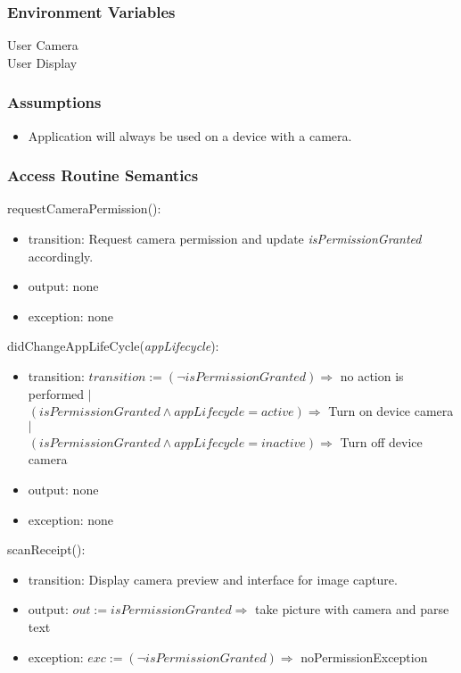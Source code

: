 \documentclass[12pt, titlepage]{article}
\begin{document}
\subsubsection{Environment Variables}

User Camera \\
User Display

\subsubsection{Assumptions}

\begin{itemize}
  \item Application will always be used on a device with a camera.
\end{itemize}

\subsubsection{Access Routine Semantics}

\noindent requestCameraPermission():
\begin{itemize}
  \item transition: Request camera permission and update \textit{isPermissionGranted} accordingly.
  \item output: none
  \item exception: none
  \end{itemize}

\noindent didChangeAppLifeCycle(\textit{appLifecycle}):
\begin{itemize}
  \item transition: $transition := (\neg isPermissionGranted) \Rightarrow$ no action is performed $|$\\
                    $(isPermissionGranted \land appLifecycle = active) \Rightarrow$ Turn on device camera $|$\\
                    $(isPermissionGranted \land appLifecycle = inactive) \Rightarrow$ Turn off device camera
  \item output: none
  \item exception: none
\end{itemize}

\noindent scanReceipt():
\begin{itemize}
  \item transition: Display camera preview and interface for image capture.
  \item output: $out := isPermissionGranted \Rightarrow$ take picture with camera and parse text
  \item exception: $exc := (\neg isPermissionGranted) \Rightarrow$ noPermissionException
\end{itemize}
\end{document}
